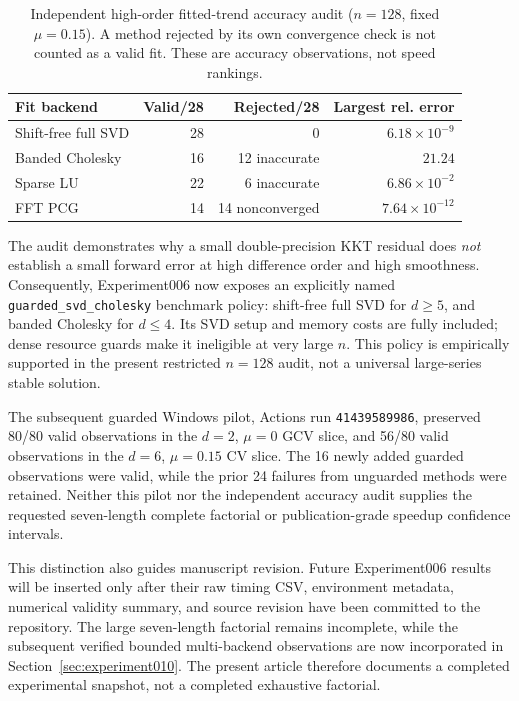 \begin{table}[t]
\caption{Independent high-order fitted-trend accuracy audit ($n=128$,
fixed $\mu=0.15$). A method rejected by its own convergence check is
not counted as a valid fit. These are accuracy observations, not speed
rankings.}
\label{tab:experiment006-highd}
\centering
\setlength{\tabcolsep}{3.5pt}
\begin{tabular}{@{}lrrr@{}}
\toprule
Fit backend & Valid/28 & Rejected/28 & Largest rel. error\\
\midrule
Shift-free full SVD & 28 & 0 & $6.18\times10^{-9}$\\
Banded Cholesky & 16 & 12 inaccurate & $21.24$\\
Sparse LU & 22 & 6 inaccurate & $6.86\times10^{-2}$\\
FFT PCG & 14 & 14 nonconverged & $7.64\times10^{-12}$\\
\bottomrule
\end{tabular}
\end{table}

The audit demonstrates why a small double-precision KKT residual does
\emph{not} establish a small forward error at high difference order and
high smoothness. Consequently, Experiment006 now exposes an explicitly
named \texttt{guarded\_svd\_cholesky} benchmark policy: shift-free full
SVD for $d\geq5$, and banded Cholesky for $d\leq4$.
Its SVD setup and memory costs are fully included; dense resource
guards make it ineligible at very large $n$. This policy is empirically
supported in the present restricted $n=128$ audit, not a universal
large-series stable solution.

The subsequent guarded Windows pilot, Actions run
\texttt{41439589986}, preserved 80/80 valid observations in the
$d=2$, $\mu=0$ GCV slice, and 56/80 valid observations in the
$d=6$, $\mu=0.15$ CV slice. The 16 newly added guarded observations
were valid, while the prior 24 failures from unguarded methods were
retained. Neither this pilot nor the independent accuracy audit
supplies the requested seven-length complete factorial or
publication-grade speedup confidence intervals.

This distinction also guides manuscript revision. Future Experiment006 results will be inserted only after their raw timing CSV, environment metadata, numerical validity summary, and source revision have been committed to the repository. The large seven-length factorial remains incomplete, while the subsequent verified bounded multi-backend observations are now incorporated in Section~\ref{sec:experiment010}. The present article therefore documents a completed experimental snapshot, not a completed exhaustive factorial.
